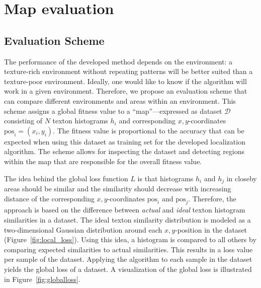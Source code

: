 \documentclass[11pt]{report}
\begin{document}
\section{Map evaluation}
\label{sec:mapeval}

\subsection{Evaluation Scheme}
\label{sec:evaluationscheme}

The performance of the developed method depends on the environment: a
texture-rich environment without repeating patterns will be better
suited than a texture-poor environment. Ideally, one would like to
know if the algorithm will work in a given environment. Therefore, we
propose an evaluation scheme that can compare different environments
and areas within an environment. This scheme assigns a global fitness
value to a ``map''---expressed as dataset $\mathcal{D}$ consisting of
$N$ texton histograms $h_i$ and corresponding $x,y$-coordinates
$\text{pos}_i = (x_i, y_i)$. The fitness value is proportional to the
accuracy that can be expected when using this dataset as training set
for the developed localization algorithm. The scheme allows for
inspecting the dataset and detecting regions within the map that are
responsible for the overall fitness value.

The idea behind the global loss function $L$ is that histograms $h_i$
and $h_j$ in closeby areas should be similar and the similarity should
decrease with increasing distance of the corresponding
$x,y$-coordinates $\text{pos}_i$ and $\text{pos}_j$. Therefore, the
approach is based on the difference between \emph{actual} and
\emph{ideal} texton histogram similarities in a dataset. The ideal
texton similarity distribution is modeled as a two-dimensional
Gaussian distribution around each $x,y$-position in the dataset
(Figure~\ref{fig:local_loss}). Using this idea, a histogram is
compared to all others by comparing expected similarities to actual
similarities. This results in a loss value per sample of the
dataset. Applying the algorithm to each sample in the dataset yields
the global loss of a dataset. A visualization of the global loss is
illustrated in Figure~\ref{fig:globalloss}.
\end{document}
